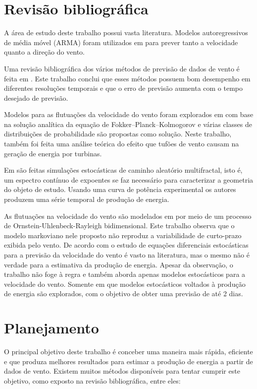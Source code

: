 \documentclass[
	12pt,				%
	openright,			%
	oneside,			%
	a4paper,			%
	english,			%
	french,				%
	spanish,			%
	brazil				%
	]{abntex2}
\begin{document}
\part{Revisão bibliográfica}

A área de estudo deste trabalho possui vasta literatura. Modelos autoregressivos de média móvel (ARMA) foram utilizados em \cite{art20} para prever tanto a velocidade quanto a direção do vento. 

Uma revisão bibliográfica dos vários métodos de previsão de dados de vento é feita em \cite{art21}. Este trabalho conclui que esses métodos possuem bom desempenho em diferentes resoluções temporais e que o erro de previsão aumenta com o tempo desejado de previsão. 

Modelos para as flutuações da velocidade do vento foram explorados em \cite{art26} com base na solução analítica da equação de Fokker–Planck–Kolmogorov e várias classes de  distribuições de probabilidade são propostas como solução. Neste trabalho, também foi feita uma análise teórica do efeito que tufões de vento causam na geração de energia por turbinas. 

Em \cite{art28} são feitas simulações estocásticas de caminho aleatório multifractal, isto é, um espectro contínuo de expoentes se faz necessário para caracterizar a geometria do objeto de estudo. Usando uma curva de potência experimental os autores produzem uma série temporal de produção de energia. 

As flutuações na velocidade do vento são modelados em \cite{art37} por meio de um processo de Ornstein-Uhlenbeck-Rayleigh bidimensional. Este trabalho observa que o modelo markoviano nele proposto não reproduz a variabilidade de curto-prazo exibida pelo vento. De acordo com \cite{art30} o estudo de equações diferenciais estocásticas para a previsão da velocidade do vento é vasto na literatura, mas o mesmo não é verdade para a estimativa da produção de energia. Apesar da observação, o trabalho não foge à regra e também aborda apenas modelos estocásticos para a velocidade do vento. Somente em \cite{art31} que modelos estocásticos voltados à produção de energia são explorados, com o objetivo de obter uma previsão de até 2 dias.

\part{Planejamento}

O principal objetivo deste trabalho é conceber uma maneira mais rápida, eficiente e que produza melhores resultados para estimar a produção de energia a partir de dados de vento. Existem muitos métodos disponíveis para tentar cumprir este objetivo, como exposto na revisão bibliográfica, entre eles:
\end{document}
